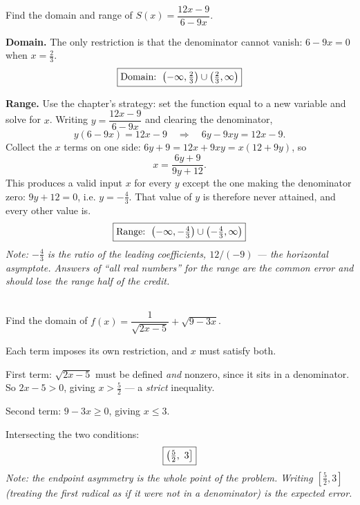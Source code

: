 \documentclass[11pt]{article}
\begin{document}

\begin{questions}[resume]

\item {}\\
  Find the domain and range of $S(x) = \dfrac{12x-9}{6-9x}$.
  \begin{solution}
    \textbf{Domain.} The only restriction is that the denominator cannot vanish:
    $6 - 9x = 0$ when $x = \tfrac{2}{3}$.
    \[ \fbox{$\displaystyle \text{Domain: } \left(-\infty,\tfrac{2}{3}\right) \cup \left(\tfrac{2}{3},\infty\right)$} \]

    \textbf{Range.} Use the chapter's strategy: set the function equal to a new variable
    and solve for $x$. Writing $y = \dfrac{12x-9}{6-9x}$ and clearing the denominator,
    \[ y(6-9x) = 12x - 9 \quad\Longrightarrow\quad 6y - 9xy = 12x - 9. \]
    Collect the $x$ terms on one side: $6y + 9 = 12x + 9xy = x(12 + 9y)$, so
    \[ x = \frac{6y+9}{9y+12}. \]
    This produces a valid input $x$ for every $y$ except the one making the denominator
    zero: $9y + 12 = 0$, i.e. $y = -\tfrac{4}{3}$. That value of $y$ is therefore never
    attained, and every other value is.
    \[ \fbox{$\displaystyle \text{Range: } \left(-\infty,-\tfrac{4}{3}\right) \cup \left(-\tfrac{4}{3},\infty\right)$} \]
    \textit{Note: $-\tfrac43$ is the ratio of the leading coefficients, $12/(-9)$ --- the
    horizontal asymptote. Answers of ``all real numbers'' for the range are the common
    error and should lose the range half of the credit.}
  \end{solution}

\item {}\\
  Find the domain of $f(x) = \dfrac{1}{\sqrt{2x-5}} + \sqrt{9-3x}$.
  \begin{solution}
    Each term imposes its own restriction, and $x$ must satisfy both.

    First term: $\sqrt{2x-5}$ must be defined \emph{and} nonzero, since it sits in a
    denominator. So $2x - 5 > 0$, giving $x > \tfrac{5}{2}$ --- a \emph{strict} inequality.

    Second term: $9 - 3x \ge 0$, giving $x \le 3$.

    Intersecting the two conditions:
    \[ \fbox{$\displaystyle \left(\tfrac{5}{2},\ 3\right]$} \]
    \textit{Note: the endpoint asymmetry is the whole point of the problem. Writing
    $\left[\tfrac52, 3\right]$ (treating the first radical as if it were not in a
    denominator) is the expected error.}
  \end{solution}


\end{questions}
\end{document}
